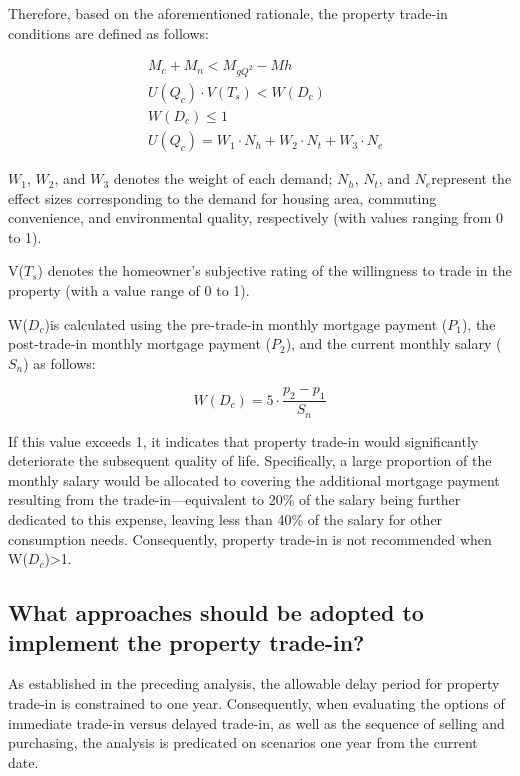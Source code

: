 \documentclass{mcmthesis}
\begin{document}
Therefore, based on the aforementioned rationale, the property trade-in conditions are defined as follows:

\begin{equation} \label{eq:feasibility_conditions}
\begin{aligned}
&M_c + M_n < M_{g Q^2} - M h \\
&U(Q_c) \cdot V(T_s) < W(D_c) \\
&W(D_c) \leq 1 \\
&U(Q_c) = W_1 \cdot N_h + W_2 \cdot N_t + W_3 \cdot N_e
\end{aligned}
\end{equation}

$W_1$, $W_2$, and $W_3$ denotes the weight of each demand; $N_h$, $N_t$, and $N_e$
​represent the effect sizes corresponding to the demand for housing area, commuting convenience, 
and environmental quality, respectively (with values ranging from 0 to 1).

V($T_s$)
denotes the homeowner's subjective rating of the willingness to trade in the property (with a value range of 0 to 1).

W($D_c$)is calculated using the pre-trade-in monthly mortgage payment ($P_1$), the post-trade-in monthly mortgage payment ($P_2$), 
and the current monthly salary ($S_n$) as follows: 

\begin{equation} \label{eq:debt_burden}
W(D_c) = 5 \cdot \frac{p_2 - p_1}{S_n}
\end{equation}

If this value exceeds 1, it indicates that property trade-in would significantly deteriorate the subsequent quality of life. 
Specifically, a large proportion of the monthly salary would be allocated to covering the additional mortgage payment 
resulting from the trade-in—equivalent to 20\% of the salary being further dedicated to this expense, 
leaving less than 40\% of the salary for other consumption needs. Consequently, property trade-in is not recommended 
when W($D_c$)>1.

\subsection{What approaches should be adopted to implement the property trade-in?} %

As established in the preceding analysis, the allowable delay period for property trade-in is constrained to one year. 
Consequently, when evaluating the options of immediate trade-in versus delayed trade-in,
as well as the sequence of selling and purchasing, the analysis is predicated on scenarios one year from the current date.
\end{document}
